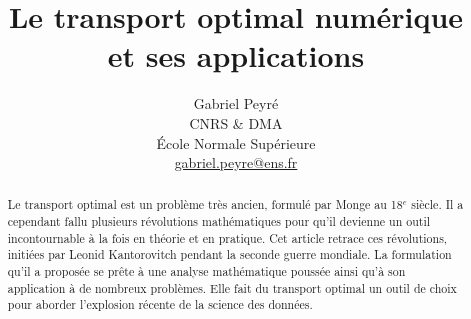 \documentclass[11pt]{article}
\title{Le transport optimal numérique \\ et ses applications}
\author{%
\begin{tabular}{c}
	Gabriel Peyr{\'e} \\ CNRS \& DMA \\
	 \'Ecole Normale Sup\'erieure \\
	 \url{gabriel.peyre@ens.fr}
\end{tabular}
}
\date{}
\begin{document}
\maketitle

\begin{abstract}
Le transport optimal est un problème très ancien, formulé par Monge au 18$^e$ siècle. Il a cependant fallu plusieurs révolutions mathématiques pour qu'il devienne un outil incontournable à la fois en théorie et en pratique. Cet article retrace ces révolutions, initiées par Leonid Kantorovitch pendant la seconde guerre mondiale. La formulation qu'il a proposée se prête à une analyse mathématique poussée ainsi qu'à son application à de nombreux problèmes. Elle fait du transport optimal un outil de choix pour aborder l'explosion récente de la science des données. 
\end{abstract}





\end{document}

